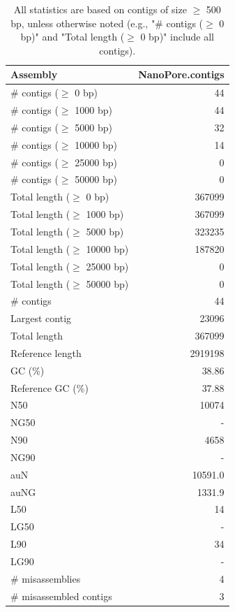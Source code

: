 \documentclass[12pt,a4paper]{article}
\begin{document}
\begin{table}[ht]
\begin{center}
\caption{All statistics are based on contigs of size $\geq$ 500 bp, unless otherwise noted (e.g., "\# contigs ($\geq$ 0 bp)" and "Total length ($\geq$ 0 bp)" include all contigs).}
\begin{tabular}{|l*{1}{|r}|}
\hline
Assembly & NanoPore.contigs \\ \hline
\# contigs ($\geq$ 0 bp) & 44 \\ \hline
\# contigs ($\geq$ 1000 bp) & 44 \\ \hline
\# contigs ($\geq$ 5000 bp) & 32 \\ \hline
\# contigs ($\geq$ 10000 bp) & 14 \\ \hline
\# contigs ($\geq$ 25000 bp) & 0 \\ \hline
\# contigs ($\geq$ 50000 bp) & 0 \\ \hline
Total length ($\geq$ 0 bp) & 367099 \\ \hline
Total length ($\geq$ 1000 bp) & 367099 \\ \hline
Total length ($\geq$ 5000 bp) & 323235 \\ \hline
Total length ($\geq$ 10000 bp) & 187820 \\ \hline
Total length ($\geq$ 25000 bp) & 0 \\ \hline
Total length ($\geq$ 50000 bp) & 0 \\ \hline
\# contigs & 44 \\ \hline
Largest contig & 23096 \\ \hline
Total length & 367099 \\ \hline
Reference length & 2919198 \\ \hline
GC (\%) & 38.86 \\ \hline
Reference GC (\%) & 37.88 \\ \hline
N50 & 10074 \\ \hline
NG50 & - \\ \hline
N90 & 4658 \\ \hline
NG90 & - \\ \hline
auN & 10591.0 \\ \hline
auNG & 1331.9 \\ \hline
L50 & 14 \\ \hline
LG50 & - \\ \hline
L90 & 34 \\ \hline
LG90 & - \\ \hline
\# misassemblies & 4 \\ \hline
\# misassembled contigs & 3 \\ \hline

\end{tabular}
\end{center}
\end{table}
\end{document}
